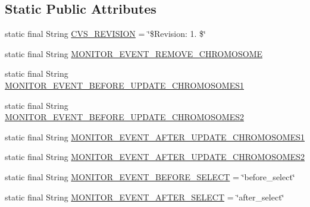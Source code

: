 \subsection*{Static Public Attributes}
\begin{DoxyCompactItemize}
\item 
static final String \hyperlink{interfaceorg_1_1jgap_1_1audit_1_1_i_evolution_monitor_a7fbd292e0d067b82eb5de8d6ee84c634}{C\-V\-S\-\_\-\-R\-E\-V\-I\-S\-I\-O\-N} = \char`\"{}\$Revision\-: 1. \$\char`\"{}
\item 
static final String \hyperlink{interfaceorg_1_1jgap_1_1audit_1_1_i_evolution_monitor_af1338d6231278758869cfd6a5e8acea5}{M\-O\-N\-I\-T\-O\-R\-\_\-\-E\-V\-E\-N\-T\-\_\-\-R\-E\-M\-O\-V\-E\-\_\-\-C\-H\-R\-O\-M\-O\-S\-O\-M\-E}
\item 
static final String \hyperlink{interfaceorg_1_1jgap_1_1audit_1_1_i_evolution_monitor_a1e6e58c771efa19aeaa27cc7025b6de4}{M\-O\-N\-I\-T\-O\-R\-\_\-\-E\-V\-E\-N\-T\-\_\-\-B\-E\-F\-O\-R\-E\-\_\-\-U\-P\-D\-A\-T\-E\-\_\-\-C\-H\-R\-O\-M\-O\-S\-O\-M\-E\-S1}
\item 
static final String \hyperlink{interfaceorg_1_1jgap_1_1audit_1_1_i_evolution_monitor_a8063f1e15ac4292270e92e6393ab3124}{M\-O\-N\-I\-T\-O\-R\-\_\-\-E\-V\-E\-N\-T\-\_\-\-B\-E\-F\-O\-R\-E\-\_\-\-U\-P\-D\-A\-T\-E\-\_\-\-C\-H\-R\-O\-M\-O\-S\-O\-M\-E\-S2}
\item 
static final String \hyperlink{interfaceorg_1_1jgap_1_1audit_1_1_i_evolution_monitor_ab3c2b0d2ba80028cf13d9fc7997c1873}{M\-O\-N\-I\-T\-O\-R\-\_\-\-E\-V\-E\-N\-T\-\_\-\-A\-F\-T\-E\-R\-\_\-\-U\-P\-D\-A\-T\-E\-\_\-\-C\-H\-R\-O\-M\-O\-S\-O\-M\-E\-S1}
\item 
static final String \hyperlink{interfaceorg_1_1jgap_1_1audit_1_1_i_evolution_monitor_aaa3ffaf6df6b5ae5b41e8352969b503a}{M\-O\-N\-I\-T\-O\-R\-\_\-\-E\-V\-E\-N\-T\-\_\-\-A\-F\-T\-E\-R\-\_\-\-U\-P\-D\-A\-T\-E\-\_\-\-C\-H\-R\-O\-M\-O\-S\-O\-M\-E\-S2}
\item 
static final String \hyperlink{interfaceorg_1_1jgap_1_1audit_1_1_i_evolution_monitor_aad8673b6b084b7a1bceaa9877a34f1e3}{M\-O\-N\-I\-T\-O\-R\-\_\-\-E\-V\-E\-N\-T\-\_\-\-B\-E\-F\-O\-R\-E\-\_\-\-S\-E\-L\-E\-C\-T} = \char`\"{}before\-\_\-select\char`\"{}
\item 
static final String \hyperlink{interfaceorg_1_1jgap_1_1audit_1_1_i_evolution_monitor_a2c7a5270a8d8bbbf8ebec5a912c42ee5}{M\-O\-N\-I\-T\-O\-R\-\_\-\-E\-V\-E\-N\-T\-\_\-\-A\-F\-T\-E\-R\-\_\-\-S\-E\-L\-E\-C\-T} = \char`\"{}after\-\_\-select\char`\"{}
\item 

\end{DoxyCompactItemize}
